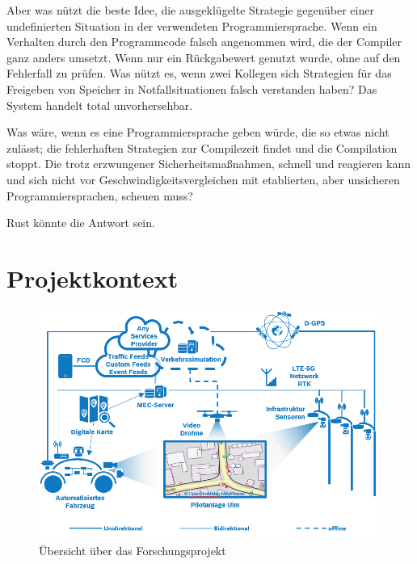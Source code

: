 Aber was nützt die beste Idee, die ausgeklügelte Strategie gegenüber einer undefinierten Situation in der verwendeten Programmiersprache.
Wenn ein Verhalten durch den Programmcode falsch angenommen wird, die der Compiler ganz anders umsetzt.
Wenn nur ein Rückgabewert genutzt wurde, ohne auf den Fehlerfall zu prüfen.
Was nützt es, wenn zwei Kollegen sich Strategien für das Freigeben von Speicher in Notfallsituationen falsch verstanden haben?
Das System handelt total unvorhersehbar.

Was wäre, wenn es eine Programmiersprache geben würde, die so etwas nicht zulässt; die fehlerhaften Strategien zur Compilezeit findet und die Compilation stoppt.
Die trotz erzwungener Sicherheitsmaßnahmen, schnell und  reagieren kann und sich nicht vor Geschwindigkeitsvergleichen mit etablierten, aber unsicheren Programmiersprachen, scheuen muss?

Rust könnte die Antwort sein.







\section{Projektkontext}
\begin{figure}[H]
	\label{test 123}
	\centering
	\includegraphics[width=\textwidth]{images/MECView_Arch_de_V1_mod.png}
	\caption{Übersicht über das Forschungsprojekt \cite{mec:home}}
\end{figure}

